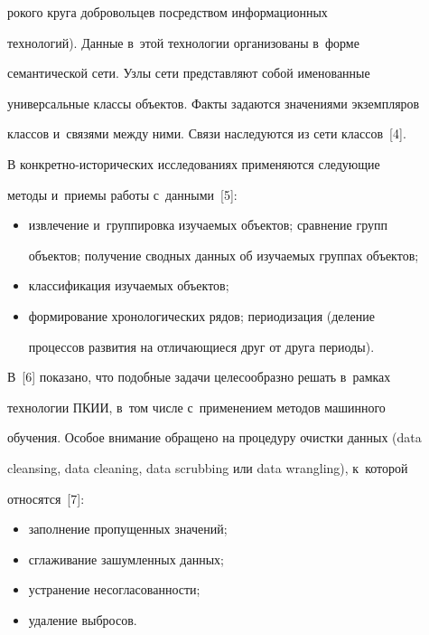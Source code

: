 \noindent


рокого круга добровольцев посредством информационных 


технологий). Данные в~этой технологии организованы в~форме 


семантической сети. Узлы сети представляют собой именованные 


универсальные классы объектов. Факты задаются значениями экземпляров 


классов и~связями между ними. Связи наследуются из сети классов~[4]. 


  


  В конкретно-исторических исследованиях применяются следующие 


методы и~приемы работы с~данными~[5]:


  \begin{itemize}


  \item извлечение и~группировка изучаемых объектов; сравнение групп 


объектов; получение сводных данных об изучаемых группах объектов; 


\item классификация изучаемых объектов; 


  \item формирование хронологических рядов; периодизация (деление 


процессов развития на отличающиеся друг от друга периоды).


  \end{itemize}


  


  В~[6] показано, что подобные задачи целесообразно решать в~рамках 


технологии ПКИИ, в~том числе с~применением методов машинного 


обучения. Особое внимание обращено на процедуру очистки данных (data 


cleansing, data cleaning, data scrubbing или data wrangling), к~которой 


относятся~[7]:


  \begin{itemize}


  \item заполнение пропущенных значений;


  \item сглаживание зашумленных данных;


  \item устранение несогласованности;


  \item удаление выбросов.


  \end{itemize}


